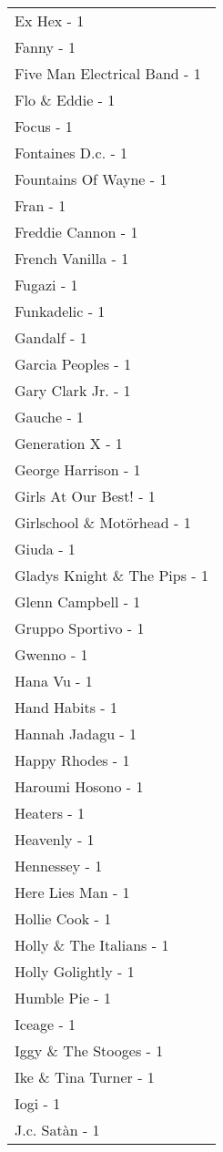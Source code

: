 \documentclass[
]{article}
\begin{document}
\begin{longtable}{l}
Ex Hex - 1 \\ 
Fanny - 1 \\ 
Five Man Electrical Band - 1 \\ 
Flo \& Eddie - 1 \\ 
Focus - 1 \\ 
Fontaines D.c. - 1 \\ 
Fountains Of Wayne - 1 \\ 
Fran - 1 \\ 
Freddie Cannon - 1 \\ 
French Vanilla - 1 \\ 
Fugazi - 1 \\ 
Funkadelic - 1 \\ 
Gandalf - 1 \\ 
Garcia Peoples - 1 \\ 
Gary Clark Jr. - 1 \\ 
Gauche - 1 \\ 
Generation X - 1 \\ 
George Harrison - 1 \\ 
Girls At Our Best! - 1 \\ 
Girlschool \& Motörhead - 1 \\ 
Giuda - 1 \\ 
Gladys Knight \& The Pips - 1 \\ 
Glenn Campbell - 1 \\ 
Gruppo Sportivo - 1 \\ 
Gwenno - 1 \\ 
Hana Vu - 1 \\ 
Hand Habits - 1 \\ 
Hannah Jadagu - 1 \\ 
Happy Rhodes - 1 \\ 
Haroumi Hosono - 1 \\ 
Heaters - 1 \\ 
Heavenly - 1 \\ 
Hennessey - 1 \\ 
Here Lies Man - 1 \\ 
Hollie Cook - 1 \\ 
Holly \& The Italians - 1 \\ 
Holly Golightly - 1 \\ 
Humble Pie - 1 \\ 
Iceage - 1 \\ 
Iggy \& The Stooges - 1 \\ 
Ike \& Tina Turner - 1 \\ 
Iogi - 1 \\ 
J.c. Satàn - 1 \\ 

\end{longtable}
\end{document}
